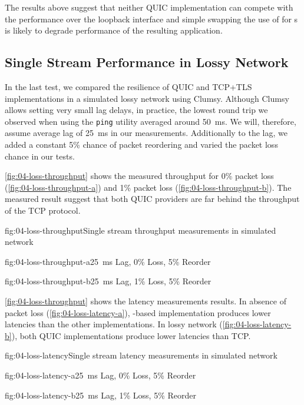 The results above suggest that neither QUIC implementation can compete with the \SslStream{}
performance over the loopback interface and simple swapping the use of \SslStream{} for
\QuicStream{}s is likely to degrade performance of the resulting application.

\subsection{Single Stream Performance in Lossy Network}

In the last test, we compared the resilience of QUIC and TCP+TLS implementations in a simulated
lossy network using Clumsy. Although Clumsy allows setting very small lag delays, in practice, the
lowest round trip we observed when using the \texttt{ping} utility averaged around
\SI{50}{\milli\second}. We will, therefore, assume average lag of \SI{25}{\milli\second} in our
measurements. Additionally to the lag, we added a constant 5\% chance of packet reordering and
varied the packet loss chance in our tests.

\autoref{fig:04-loss-throughput} shows the measured throughput for 0\% packet loss
(\autoref{fig:04-loss-throughput-a}) and 1\% packet loss (\autoref{fig:04-loss-throughput-b}). The
measured result suggest that both QUIC providers are far behind the throughput of the TCP protocol.

\begin{myFigure}{fig:04-loss-throughput}{Single stream throughput measurements in simulated network}
\begin{mySubfigure}{0.49\linewidth}{fig:04-loss-throughput-a}{\SI{25}{\milli\second} Lag, 0\% Loss, 5\% Reorder}
\footnotesize

\end{mySubfigure}
\begin{mySubfigure}{0.49\linewidth}{fig:04-loss-throughput-b}{\SI{25}{\milli\second} Lag, 1\% Loss, 5\% Reorder}
\footnotesize

\end{mySubfigure}
\end{myFigure}

\autoref{fig:04-loss-throughput} shows the latency measurements results. In absence of packet loss
(\autoref{fig:04-loss-latency-a}), \libmsquic{}-based implementation produces lower latencies than
the other implementations. In lossy network (\autoref{fig:04-loss-latency-b}), both QUIC
implementations produce lower latencies than TCP\@.

\begin{myFigure}{fig:04-loss-latency}{Single stream latency measurements in simulated network}
\begin{mySubfigure}{0.49\linewidth}{fig:04-loss-latency-a}{\SI{25}{\milli\second} Lag, 0\% Loss, 5\% Reorder}
\footnotesize

\end{mySubfigure}
\begin{mySubfigure}{0.49\linewidth}{fig:04-loss-latency-b}{\SI{25}{\milli\second} Lag, 1\% Loss, 5\% Reorder}
\footnotesize

\end{mySubfigure}
\end{myFigure}

